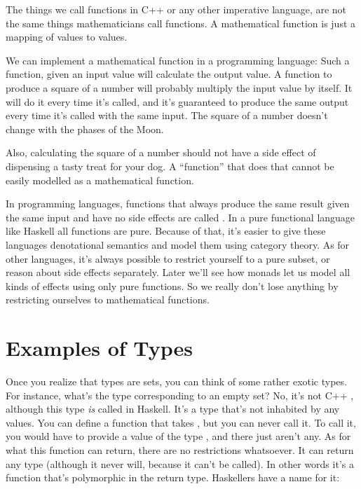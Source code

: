 The things we call functions in C++ or any other imperative language,
are not the same things mathematicians call functions. A mathematical
function is just a mapping of values to values.

We can implement a mathematical function in a programming language: Such
a function, given an input value will calculate the output value. A
function to produce a square of a number will probably multiply the
input value by itself. It will do it every time it's called, and it's
guaranteed to produce the same output every time it's called with the
same input. The square of a number doesn't change with the phases of the
Moon.

Also, calculating the square of a number should not have a side effect
of dispensing a tasty treat for your dog. A ``function'' that does that
cannot be easily modelled as a mathematical function.

In programming languages, functions that always produce the same result
given the same input and have no side effects are called . In a pure functional language like Haskell all functions are
pure. Because of that, it's easier to give these languages denotational
semantics and model them using category theory. As for other languages,
it's always possible to restrict yourself to a pure subset, or reason
about side effects separately. Later we'll see how monads let us model
all kinds of effects using only pure functions. So we really don't lose
anything by restricting ourselves to mathematical functions.

\section{Examples of Types}\label{examples-of-types}

Once you realize that types are sets, you can think of some rather
exotic types. For instance, what's the type corresponding to an empty
set? No, it's not C++ , although this type \emph{is} called
 in Haskell. It's a type that's not inhabited by any
values. You can define a function that takes , but you can
never call it. To call it, you would have to provide a value of the type
, and there just aren't any. As for what this function can
return, there are no restrictions whatsoever. It can return any type
(although it never will, because it can't be called). In other words
it's a function that's polymorphic in the return type. Haskellers have a
name for it:

